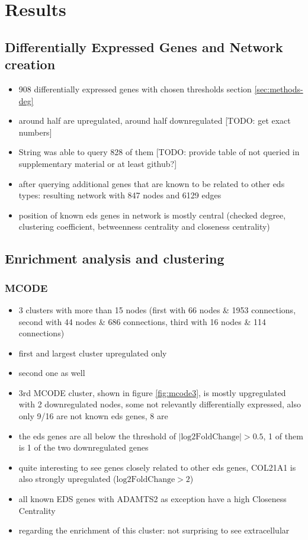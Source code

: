 \section{Results}
\subsection{Differentially Expressed Genes and Network creation}
\begin{itemize}
	\item 908 differentially expressed genes with chosen thresholds section \ref{sec:methods-deg}
	\item around half are upregulated, around half downregulated [TODO: get exact numbers]
	\item String was able to query 828 of them [TODO: provide table of not queried in supplementary material or at least github?]
	\item after querying additional genes that are known to be related to other eds types: resulting network with 847 nodes and 6129 edges
	\item position of known eds genes in network is mostly central (checked degree, clustering coefficient, betweenness centrality and closeness centrality)
\end{itemize}

\subsection{Enrichment analysis and clustering}

\subsubsection{MCODE}

\begin{itemize}
	\item 3 clusters with more than 15 nodes (first with 66 nodes \& 1953 connections, second with 44 nodes \& 686 connections, third with 16 nodes \& 114 connections)
	\item first and largest cluster upregulated only
	\item second one as well
	\item 3rd MCODE cluster, shown in figure \ref{fig:mcode3}, is mostly upgregulated with 2 downregulated nodes, some not relevantly differentially expressed, also only 9/16 are not known eds genes, 8 are
	\item the eds genes are all below the threshold of $|\text{log2FoldChange}| > 0.5$, 1 of them is 1 of the two downregulated genes
	\item quite interesting to see genes closely related to other eds genes, COL21A1 is also strongly upregulated ($\text{log2FoldChange} > 2$)
	\item all known EDS genes with ADAMTS2 as exception have a high Closeness Centrality
	\item regarding the enrichment of this cluster: not surprising to see extracellular
\end{itemize}

